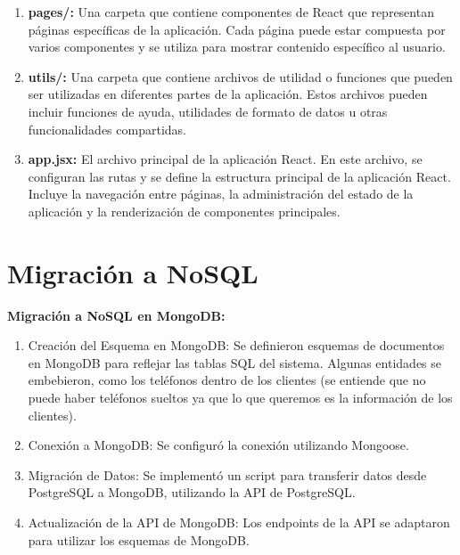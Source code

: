 \documentclass[a4paper,12pt]{article}
\begin{document}
\begin{enumerate}
\begin{enumerate}
			\item \textbf{pages/:} Una carpeta que contiene componentes de React que representan páginas específicas de la aplicación. Cada página puede estar compuesta por varios componentes y se utiliza para mostrar contenido específico al usuario.
			
			\item \textbf{utils/:} Una carpeta que contiene archivos de utilidad o funciones que pueden ser utilizadas en diferentes partes de la aplicación. Estos archivos pueden incluir funciones de ayuda, utilidades de formato de datos u otras funcionalidades compartidas.
			
			\item \textbf{app.jsx:} El archivo principal de la aplicación React. En este archivo, se configuran las rutas y se define la estructura principal de la aplicación React. Incluye la navegación entre páginas, la administración del estado de la aplicación y la renderización de componentes principales.
		\end{enumerate}
	\end{enumerate}

	\newpage
	
	\section{Migración a NoSQL}
	
	\textbf{Migración a NoSQL en MongoDB:}
	
		\begin{enumerate}
			
		\item Creación del Esquema en MongoDB: Se definieron esquemas de documentos en MongoDB para reflejar las tablas SQL del sistema. Algunas entidades se embebieron, como los teléfonos dentro de los clientes (se entiende que no puede haber teléfonos sueltos ya que lo que queremos es la información de los clientes).
		
		\item Conexión a MongoDB: Se configuró la conexión utilizando Mongoose.
		
		\item Migración de Datos: Se implementó un script para transferir datos desde PostgreSQL a MongoDB, utilizando la API de PostgreSQL.
		
		\item Actualización de la API de MongoDB: Los endpoints de la API se adaptaron para utilizar los esquemas de MongoDB.
		
		\end{enumerate}
\end{document}
